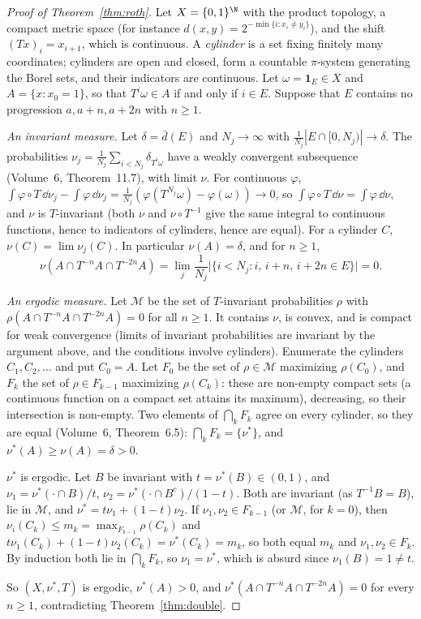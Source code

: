 \begin{proof}[Proof of Theorem~\ref{thm:roth}]
Let $X=\{0,1\}^\N$ with the product topology, a compact metric space (for instance $d(x,y)=2^{-\min\{i:x_i\neq y_i\}}$), and the shift $(Tx)_i=x_{i+1}$, which is continuous. A \emph{cylinder} is a set fixing finitely many coordinates;
cylinders are open and closed, form a countable $\pi$-system generating the Borel sets, and their indicators are continuous. Let $\omega=\mathbf 1_E\in X$ and $A=\{x:x_0=1\}$, so that $T^i\omega\in A$ if and only if $i\in E$.
Suppose that $E$ contains no progression $a,a+n,a+2n$ with $n\ge1$.

\emph{An invariant measure.} Let $\delta=\bar d(E)$ and $N_j\to\infty$ with $\frac1{N_j}|E\cap[0,N_j)|\to\delta$. The probabilities $\nu_j=\frac1{N_j}\sum_{i<N_j}\delta_{T^i\omega}$ have a weakly convergent subsequence (Volume~6, Theorem~11.7), with limit $\nu$.
For continuous $\varphi$, $\int\varphi\circ T\,\dd\nu_j-\int\varphi\,\dd\nu_j=\frac1{N_j}(\varphi(T^{N_j}\omega)-\varphi(\omega))\to0$, so $\int\varphi\circ T\,\dd\nu=\int\varphi\,\dd\nu$, and $\nu$ is $T$-invariant (both $\nu$ and $\nu\circ T^{-1}$ give the same
integral to continuous functions, hence to indicators of cylinders, hence are equal). For a cylinder $C$, $\nu(C)=\lim\nu_j(C)$. In particular $\nu(A)=\delta$, and for $n\ge1$,
\[
\nu(A\cap T^{-n}A\cap T^{-2n}A)=\lim_j\frac1{N_j}\bigl|\{i<N_j:i,\,i+n,\,i+2n\in E\}\bigr|=0.
\]

\emph{An ergodic measure.} Let $\mathcal M$ be the set of $T$-invariant probabilities $\rho$ with $\rho(A\cap T^{-n}A\cap T^{-2n}A)=0$ for all $n\ge1$. It contains $\nu$, is convex, and is compact for weak convergence (limits of invariant
probabilities are invariant by the argument above, and the conditions involve cylinders). Enumerate the cylinders $C_1,C_2,\dots$ and put $C_0=A$. Let $F_0$ be the set of $\rho\in\mathcal M$ maximizing $\rho(C_0)$, and $F_k$ the set of $\rho\in F_{k-1}$ maximizing $\rho(C_k)$:
these are non-empty compact sets (a continuous function on a compact set attains its maximum), decreasing, so their intersection is non-empty. Two elements of $\bigcap_kF_k$ agree on every cylinder, so they are equal (Volume~6, Theorem~6.5):
$\bigcap_kF_k=\{\nu^*\}$, and $\nu^*(A)\ge\nu(A)=\delta>0$.

$\nu^*$ is ergodic. Let $B$ be invariant with $t=\nu^*(B)\in(0,1)$, and $\nu_1=\nu^*(\cdot\cap B)/t$, $\nu_2=\nu^*(\cdot\cap B^c)/(1-t)$. Both are invariant (as $T^{-1}B=B$), lie in $\mathcal M$, and $\nu^*=t\nu_1+(1-t)\nu_2$. If $\nu_1,\nu_2\in F_{k-1}$
(or $\mathcal M$, for $k=0$), then $\nu_i(C_k)\le m_k=\max_{F_{k-1}}\rho(C_k)$ and $t\nu_1(C_k)+(1-t)\nu_2(C_k)=\nu^*(C_k)=m_k$, so both equal $m_k$ and $\nu_1,\nu_2\in F_k$. By induction both lie in $\bigcap_kF_k$, so $\nu_1=\nu^*$, which is absurd since
$\nu_1(B)=1\neq t$.

So $(X,\nu^*,T)$ is ergodic, $\nu^*(A)>0$, and $\nu^*(A\cap T^{-n}A\cap T^{-2n}A)=0$ for every $n\ge1$, contradicting Theorem~\ref{thm:double}.
\end{proof}

